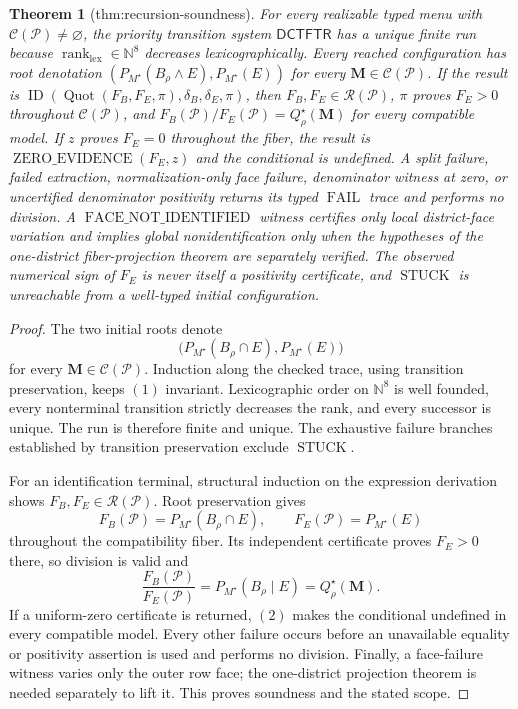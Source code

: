 \documentclass{article}
\newtheorem{theorem}{Theorem}
\begin{document}
\begin{theorem}[thm:recursion-soundness]\label{thm:recursion-soundness}
For every realizable typed menu with \(\mathcal C(\mathcal P)\ne\varnothing\), the priority transition system \(\mathsf{DCTFTR}\) has a unique finite run because \(\operatorname{rank}_{\mathrm{lex}}\in\mathbb N^8\) decreases lexicographically. Every reached configuration has root denotation \((P_{M^\star}(B_\rho\wedge E),P_{M^\star}(E))\) for every \(\mathbf M\in\mathcal C(\mathcal P)\). If the result is \(\operatorname{ID}(\operatorname{Quot}(F_B,F_E,\pi),\delta_B,\delta_E,\pi)\), then \(F_B,F_E\in\mathscr R(\mathcal P)\), \(\pi\) proves \(F_E>0\) throughout \(\mathcal C(\mathcal P)\), and \(F_B(\mathcal P)/F_E(\mathcal P)=Q_\rho^\star(\mathbf M)\) for every compatible model. If \(z\) proves \(F_E=0\) throughout the fiber, the result is \(\operatorname{ZERO\_EVIDENCE}(F_E,z)\) and the conditional is undefined. A split failure, failed extraction, normalization-only face failure, denominator witness at zero, or uncertified denominator positivity returns its typed \(\operatorname{FAIL}\) trace and performs no division. A \(\operatorname{FACE\_NOT\_IDENTIFIED}\) witness certifies only local district-face variation and implies global nonidentification only when the hypotheses of the one-district fiber-projection theorem are separately verified. The observed numerical sign of \(F_E\) is never itself a positivity certificate, and \(\operatorname{STUCK}\) is unreachable from a well-typed initial configuration.
\end{theorem}
\begin{proof}
The two initial roots denote
\[
\bigl(P_{M^\star}(B_\rho\cap E),P_{M^\star}(E)\bigr)
\tag{1}
\]
for every \(\mathbf M\in\mathcal C(\mathcal P)\).  Induction along the checked trace, using transition preservation, keeps \((1)\) invariant.  Lexicographic order on \(\mathbb N^8\) is well founded, every nonterminal transition strictly decreases the rank, and every successor is unique.  The run is therefore finite and unique.  The exhaustive failure branches established by transition preservation exclude \(\operatorname{STUCK}\).

For an identification terminal, structural induction on the expression derivation shows \(F_B,F_E\in\mathscr R(\mathcal P)\).  Root preservation gives
\[
F_B(\mathcal P)=P_{M^\star}(B_\rho\cap E),
\qquad
F_E(\mathcal P)=P_{M^\star}(E)
\tag{2}
\]
throughout the compatibility fiber.  Its independent certificate proves \(F_E>0\) there, so division is valid and
\[
\frac{F_B(\mathcal P)}{F_E(\mathcal P)}
=P_{M^\star}(B_\rho\mid E)=Q_\rho^\star(\mathbf M).
\tag{3}
\]
If a uniform-zero certificate is returned, \((2)\) makes the conditional undefined in every compatible model.  Every other failure occurs before an unavailable equality or positivity assertion is used and performs no division.  Finally, a face-failure witness varies only the outer row face; the one-district projection theorem is needed separately to lift it.  This proves soundness and the stated scope.
\end{proof}
\end{document}
